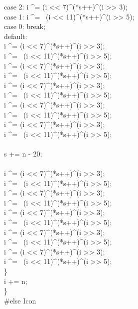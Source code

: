{\>\>\> case 2:   i \^{}= (i <{}< 7)\^{}(*s++)\^{}(i >{}> 3);\\
\>\>\> case 1:   i \^{}= ~(i <{}< 11)\^{}(*s++)\^{}(i >{}> 5);\\
\>\>\> case 0:   break;\\
\>\>\> default:\\
\>\>\>\>i \^{}= (i <{}< 7)\^{}(*s++)\^{}(i >{}> 3);\\
\>\>\>\>i \^{}= ~(i <{}< 11)\^{}(*s++)\^{}(i >{}> 5);\\
\>\>\>\>i \^{}= (i <{}< 7)\^{}(*s++)\^{}(i >{}> 3);\\
\>\>\>\>i \^{}= ~(i <{}< 11)\^{}(*s++)\^{}(i >{}> 5);\\
\>\>\>\>i \^{}= (i <{}< 7)\^{}(*s++)\^{}(i >{}> 3);\\
\>\>\>\>i \^{}= ~(i <{}< 11)\^{}(*s++)\^{}(i >{}> 5);\\
\>\>\>\>i \^{}= (i <{}< 7)\^{}(*s++)\^{}(i >{}> 3);\\
\>\>\>\>i \^{}= ~(i <{}< 11)\^{}(*s++)\^{}(i >{}> 5);\\
\>\>\>\>i \^{}= (i <{}< 7)\^{}(*s++)\^{}(i >{}> 3);\\
\>\>\>\>i \^{}= ~(i <{}< 11)\^{}(*s++)\^{}(i >{}> 5);\\
\>\>\>\>\\
\>\>\>\>s += n - 20;\\
\\
\>\>\>\>i \^{}= (i <{}< 7)\^{}(*s++)\^{}(i >{}> 3);\\
\>\>\>\>i \^{}= ~(i <{}< 11)\^{}(*s++)\^{}(i >{}> 5);\\
\>\>\>\>i \^{}= (i <{}< 7)\^{}(*s++)\^{}(i >{}> 3);\\
\>\>\>\>i \^{}= ~(i <{}< 11)\^{}(*s++)\^{}(i >{}> 5);\\
\>\>\>\>i \^{}= (i <{}< 7)\^{}(*s++)\^{}(i >{}> 3);\\
\>\>\>\>i \^{}= ~(i <{}< 11)\^{}(*s++)\^{}(i >{}> 5);\\
\>\>\>\>i \^{}= (i <{}< 7)\^{}(*s++)\^{}(i >{}> 3);\\
\>\>\>\>i \^{}= ~(i <{}< 11)\^{}(*s++)\^{}(i >{}> 5);\\
\>\>\>\>i \^{}= (i <{}< 7)\^{}(*s++)\^{}(i >{}> 3);\\
\>\>\>\>i \^{}= ~(i <{}< 11)\^{}(*s++)\^{}(i >{}> 5);\\
\>\>\}\\
\>\> i += n;\\
\>\}\\
\#else Icon
}


